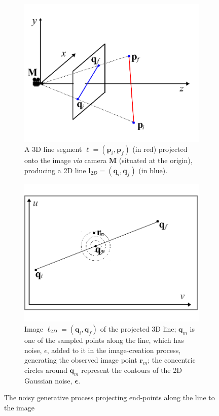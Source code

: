 \documentclass[10pt]{article}
\begin{document}
\begin{figure}
\centering
\begin{subfigure}{.4\textwidth}
  \centering
  \includegraphics[width=1\linewidth]{figures/line-projection-3d}
  \caption{A 3D line segment $\boldsymbol{\ell} = (\mathbf{p}_i, \mathbf{p}_f)$ (in red) projected onto the image {\em via} camera $\mathbf{M}$ (situated at the origin), producing a 2D line $\mathbf{l}_{2D} = (\mathbf{q}_i, \mathbf{q}_f)$ (in blue).}
  \label{fig:3d}
\end{subfigure}%
\hspace{1cm}
\begin{subfigure}{.4\textwidth}
  \centering
  \includegraphics[width=1\linewidth]{figures/line-projection-2d}
  \caption{Image $\boldsymbol{\ell}_{2D} = (\mathbf{q}_i, \mathbf{q}_f)$ of the projected 3D line; $\mathbf{q}_m$ is one of the sampled points along the line, which has noise, $\epsilon$, added to it in the image-creation process, generating the observed image point $\mathbf{r}_m$; the concentric circles around $\mathbf{q}_m$ represent the contours of the 2D Gaussian noise, $\boldsymbol{\epsilon}$.}
  \label{fig:2d}
\end{subfigure}
\caption{The noisy generative process projecting end-points along the line to the image\label{fig:line-gen}}
\end{figure}
\end{document}
